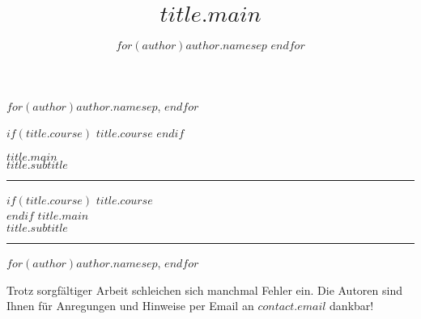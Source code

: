 \documentclass[10pt,paper=17cm:22cm, twoside=true, DIV=14]{scrbook}
\title{$title.main$}
\author{
$for(author)$$author.name$$sep$ \And $endfor$
}
\begin{document}
\frontmatter
\begin{titlepage}
\begin{center}

\vspace*{3 cm} {\large \textsf{$for(author)$$author.name$$sep$, $endfor$}}

$if(title.course)$
\vspace{1.5 cm} {\huge \textsf{$title.course$}}
$endif$

\vspace{0.5 cm} {\Huge \textbf{ \textsf{ $title.main$}}}\\
\vspace{0.5 cm} {\huge \textsf{$title.subtitle$}}


\end{center}
\cleardoublepage
\par
{}%
\hfill
{}%
\par

\begin{center}
\vspace{3 cm}
\noindent\rule{\textwidth}{0.4pt}


$if(title.course)$
\vspace{0.5 cm} {\huge \textsf{$title.course$}}\\
$endif$
\vspace{0.5 cm} {\Huge \textbf{ \textsf{ $title.main$}}}\\
\vspace{0.5 cm} {\huge \textsf{$title.subtitle$}}

\noindent\rule{\textwidth}{0.4pt}

\vspace*{1.5 cm} {\large \textsf{$for(author)$$author.name$$sep$, $endfor$}}

\clearpage


\begin{center}
\thispagestyle{impressum}
\null
\vfill

Trotz sorgfältiger Arbeit schleichen sich manchmal Fehler ein. Die Autoren sind Ihnen für Anregungen und Hinweise per Email an $contact.email$ dankbar!\\

\end{center}


\end{center}
\end{titlepage}
\end{document}
